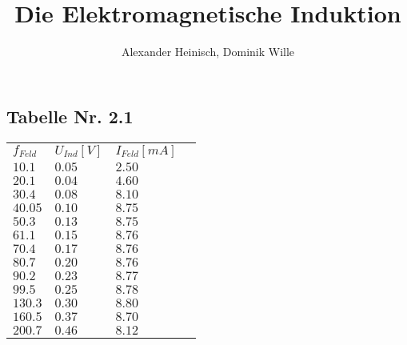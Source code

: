\documentclass{article}
\title{Die Elektromagnetische Induktion}
\author{Alexander Heinisch, Dominik Wille}
\begin{document}
\subsection*{Tabelle Nr. 2.1}
\begin{tabular}{l l l l}
\(f_{Feld}\) & \(U_{Ind}[V]\) & \(I_{Feld}[mA]\) \\
\(10.1\) & \(0.05\) & \(2.50\) \\
\(20.1\) & \(0.04\) & \(4.60\) \\
\(30.4\) & \(0.08\) & \(8.10\) \\
\(40.05\) & \(0.10\) & \(8.75\) \\
\(50.3\) & \(0.13\) & \(8.75\) \\
\(61.1\) & \(0.15\) & \(8.76\) \\
\(70.4\) & \(0.17\) & \(8.76\) \\
\(80.7\) & \(0.20\) & \(8.76\) \\
\(90.2\) & \(0.23\) & \(8.77\) \\
\(99.5\) & \(0.25\) & \(8.78\) \\
\(130.3\) & \(0.30\) & \(8.80\) \\
\(160.5\) & \(0.37\) & \(8.70\) \\
\(200.7\) & \(0.46\) & \(8.12\) \\
\end{tabular}
\end{document}
